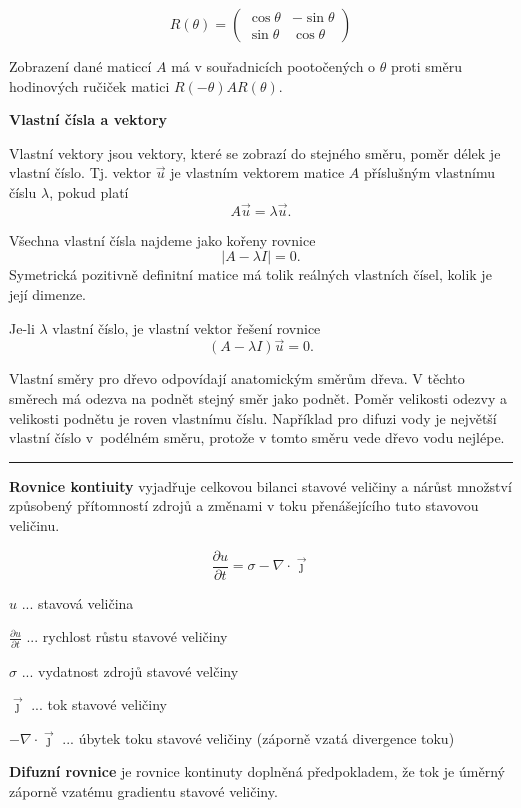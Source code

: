 \documentclass{article}
\begin{document}
\begin{multicols}{3}
$$R(\theta)=
\begin{pmatrix}
  \cos\theta & -\sin \theta\\
  \sin\theta & \cos\theta
\end{pmatrix}$$

Zobrazení dané maticcí $A$ má v souřadnicích pootočených o $\theta$ proti směru hodinových ručiček matici $R(-\theta)AR(\theta)$.


\vfill\null

\columnbreak

\textbf{Vlastní čísla a vektory}

Vlastní vektory jsou vektory, které se zobrazí do stejného směru, poměr délek je vlastní číslo. Tj. vektor $\vec u$ je vlastním vektorem matice $A$ příslušným vlastnímu číslu $\lambda$, pokud platí $$A\vec u=\lambda\vec u.$$

Všechna vlastní čísla najdeme jako kořeny rovnice $$|A-\lambda I|=0.$$ Symetrická pozitivně definitní matice má tolik reálných vlastních čísel, kolik je její dimenze. 

Je-li $\lambda$ vlastní číslo, je vlastní vektor řešení rovnice $$(A-\lambda I)\vec u=0.$$

Vlastní směry pro dřevo odpovídají anatomickým směrům dřeva. V těchto směrech má odezva na podnět stejný směr jako podnět. Poměr velikosti odezvy a velikosti podnětu je roven vlastnímu číslu. Například pro difuzi vody je největší vlastní číslo v~podélném směru, protože v tomto směru vede dřevo vodu nejlépe.

\medskip\hrule\medskip

\textbf{Rovnice kontiuity} vyjadřuje celkovou bilanci stavové veličiny a nárůst množství způsobený přítomností zdrojů a změnami v toku přenášejícího tuto stavovou veličinu.


$${\frac{\partial u}{\partial t}=\sigma -\nabla\cdot \vec \jmath}$$

$u$ ... stavová veličina

$\frac{\partial u}{\partial t}$ ... rychlost růstu stavové veličiny

$\sigma$ ... vydatnost zdrojů stavové velčiny

$\vec\jmath$ ... tok stavové veličiny

$-\nabla\cdot \vec \jmath$ ... úbytek toku stavové veličiny (záporně vzatá divergence toku)



\textbf{Difuzní rovnice} je rovnice kontinuty doplněná předpokladem, že tok je úměrný záporně vzatému gradientu stavové veličiny.


\end{multicols}
\end{document}
